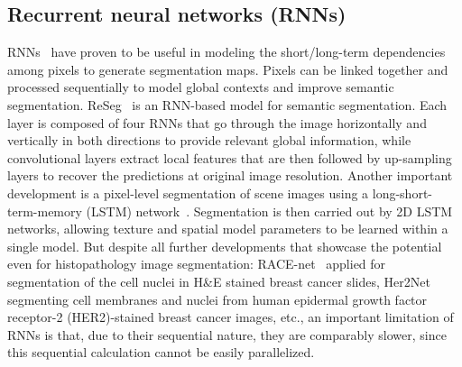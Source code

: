 \subsection{Recurrent neural networks (RNNs)}
RNNs~\cite{rumelhart1986learning} have proven to be useful in modeling the short/long-term dependencies among pixels to generate segmentation maps. Pixels can be linked together and processed sequentially to model global contexts and improve semantic segmentation. ReSeg~\cite{visin2016reseg} is an RNN-based model for semantic segmentation. Each layer is composed of four RNNs that go through the image horizontally and vertically in both directions to provide relevant global information, while convolutional layers extract local features that are then followed by up-sampling layers to recover the predictions at original image resolution. Another important development is a pixel-level segmentation of scene images using a long-short-term-memory (LSTM) network~\cite{byeon2015scene}. Segmentation is then carried out by 2D LSTM networks, allowing texture and spatial model parameters to be learned within a single model. But despite all further developments that showcase the potential even for histopathology image segmentation: RACE-net~\cite{chakravarty2018race} applied for segmentation of the cell nuclei in H\&E stained breast cancer slides, Her2Net~\cite{saha2018her2net} segmenting cell membranes and nuclei from human epidermal growth factor receptor-2 (HER2)-stained breast cancer images, etc., 
an important limitation of RNNs is that, due to their sequential nature, they are comparably slower, since this sequential calculation cannot be easily parallelized. 

